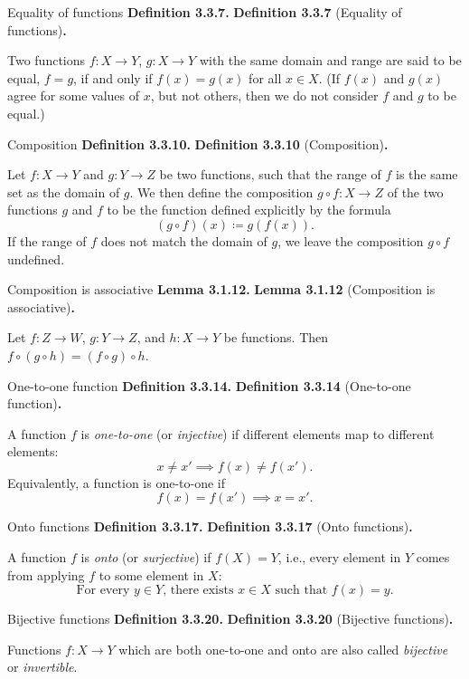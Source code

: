\documentclass[12pt]{article}
\newenvironment{df}[2][\relax]{
\vspace{4mm}
    \noindent\setlength{\parskip}{1em}%
    \ifx#1\relax%
        \textbf{#2. }%
    \else%
        \textbf{#2} (#1)\textbf{. }%
    \fi%
    \ignorespaces%
}{}
\theoremstyle{remark}
\begin{document}
\begin{df}[Equality of functions]{Definition 3.3.7}
    Two functions $f : X \to Y$, $g : X \to Y$ with the same domain and range are said to be equal, $f = g$, if and only if $f(x) = g(x)$ for all $x \in X$.
    (If $f(x)$ and $g(x)$ agree for some values of $x$, but not others, then we do not consider $f$ and $g$ to be equal.)
\end{df}


\begin{df}[Composition]{Definition 3.3.10}
     Let $f : X \to Y$ and $g : Y \to Z$ be two functions, such that the range of $f$ is the same set as the domain of $g$.
     We then define the composition $g \circ f : X \to Z$ of the two functions $g$ and $f$ to be the function defined explicitly by the formula
     \[
        (g \circ f)(x) \coloneqq g(f(x)).
    \]
    If the range of $f$ does not match the domain of $g$, we leave the composition $g \circ f$ undefined.
\end{df}


\begin{df}[Composition is associative]{Lemma 3.1.12}
    Let $f : Z \to W$, $g : Y \to Z$, and $h : X \to Y$ be functions. Then $f \circ (g \circ h) = (f \circ g) \circ h$.
\end{df}


\begin{df}[One-to-one function]{Definition 3.3.14}
    A function $f$ is \emph{one-to-one} (or \emph{injective}) if different elements map to different elements:
    \[
        x \ne x' \implies f(x) \ne f(x').
    \]
    Equivalently, a function is one-to-one if
    {\setlength{\belowdisplayskip}{-10pt} \setlength{\belowdisplayshortskip}{-10pt}
    \[
        f(x) = f(x') \implies x = x'.
    \]
    }
\end{df}


\begin{df}[Onto functions]{Definition 3.3.17}
    A function $f$ is \emph{onto} (or \emph{surjective}) if $f(X) = Y$, i.e., every element in $Y$ comes from applying $f$ to some element in $X$:
    {\setlength{\belowdisplayskip}{-10pt} \setlength{\belowdisplayshortskip}{-10pt}
    \[
        \text{For every } y \in Y\text{, there exists } x \in X \text{ such that } f(x) = y.
    \]
    }
\end{df}


\begin{df}[Bijective functions]{Definition 3.3.20}
    Functions $f : X \to Y$ which are both one-to-one and onto are also called \emph{bijective} or \emph{invertible}.
\end{df}
\end{document}
